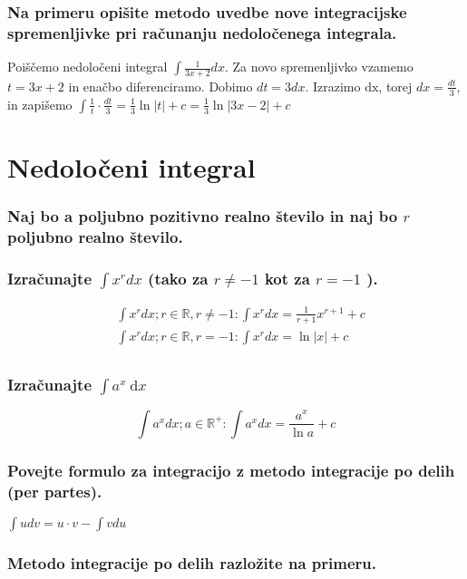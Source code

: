 \documentclass{article}
\begin{document}
\subsubsection*{Na primeru opišite metodo uvedbe nove integracijske spremenljivke pri računanju nedoločenega integrala.}

Poiščemo nedoločeni integral $\int \frac{1}{3 x+2} d x$. Za novo spremenljivko vzamemo $t=3 x+2$ in enačbo diferenciramo. Dobimo $d t=3 d x$. Izrazimo $\mathrm{dx}$, torej $d x=\frac{d t}{3}$, in zapišemo $\int \frac{1}{t} \cdot \frac{d t}{3}=\frac{1}{3} \ln |t|+c=\frac{1}{3} \ln |3 x-2|+c$

\section{Nedoločeni integral}
\subsubsection*{Naj bo a poljubno pozitivno realno število in naj bo $r$ poljubno realno število.}

\subsubsection*{Izračunajte $\int x^{r} d x$ (tako za $r \neq-1$ kot za $r=-1$ ).}

$$
\begin{aligned}
& \int x^{r} d x ; r \in \mathbb{R}, r \neq-1: \int x^{r} d x=\frac{1}{r+1} x^{r+1}+c \\
& \int x^{r} d x ; r \in \mathbb{R}, r=-1: \int x^{r} d x=\ln |x|+c \\
\end{aligned}
$$


\subsubsection*{Izračunajte $\int a^{x} \mathrm{~d} x$}

$$
\int a^{x} d x ; a \in \mathbb{R}^{+}: \int a^{x} d x=\frac{a^{x}}{\ln a}+c
$$

\subsubsection*{Povejte formulo za integracijo z metodo integracije po delih (per partes).}

$\int u d v=u \cdot v-\int v d u$

\subsubsection*{Metodo integracije po delih razložite na primeru.}
\end{document}
